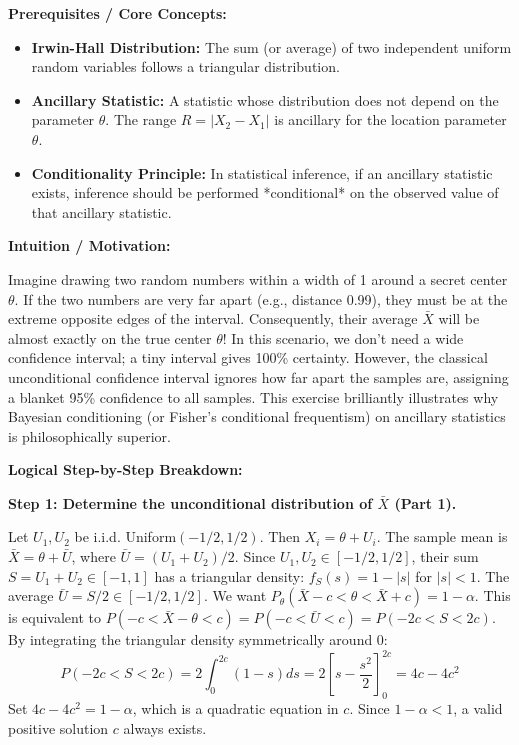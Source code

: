 \begin{solution}
\textbf{Prerequisites / Core Concepts:}
\begin{itemize}
    \item \textbf{Irwin-Hall Distribution:} The sum (or average) of two independent uniform random variables follows a triangular distribution.
    \item \textbf{Ancillary Statistic:} A statistic whose distribution does not depend on the parameter $\theta$. The range $R = |X_2 - X_1|$ is ancillary for the location parameter $\theta$.
    \item \textbf{Conditionality Principle:} In statistical inference, if an ancillary statistic exists, inference should be performed *conditional* on the observed value of that ancillary statistic.
\end{itemize}

\textbf{Intuition / Motivation:}

Imagine drawing two random numbers within a width of 1 around a secret center $\theta$. If the two numbers are very far apart (e.g., distance 0.99), they must be at the extreme opposite edges of the interval. Consequently, their average $\bar{X}$ will be almost exactly on the true center $\theta$! In this scenario, we don't need a wide confidence interval; a tiny interval gives 100\% certainty. However, the classical unconditional confidence interval ignores how far apart the samples are, assigning a blanket 95\% confidence to all samples. This exercise brilliantly illustrates why Bayesian conditioning (or Fisher's conditional frequentism) on ancillary statistics is philosophically superior.

\textbf{Logical Step-by-Step Breakdown:}

\textbf{Step 1: Determine the unconditional distribution of $\bar{X}$ (Part 1).}

Let $U_1, U_2$ be i.i.d. Uniform$(-1/2, 1/2)$. Then $X_i = \theta + U_i$.
The sample mean is $\bar{X} = \theta + \bar{U}$, where $\bar{U} = (U_1+U_2)/2$.
Since $U_1, U_2 \in [-1/2, 1/2]$, their sum $S = U_1+U_2 \in [-1, 1]$ has a triangular density: $f_S(s) = 1 - |s|$ for $|s| < 1$.
The average $\bar{U} = S/2 \in [-1/2, 1/2]$.
We want $P_\theta(\bar{X} - c < \theta < \bar{X} + c) = 1 - \alpha$.
This is equivalent to $P(-c < \bar{X} - \theta < c) = P(-c < \bar{U} < c) = P(-2c < S < 2c)$.
By integrating the triangular density symmetrically around 0:
\[ P(-2c < S < 2c) = 2 \int_0^{2c} (1-s) ds = 2 \left[ s - \frac{s^2}{2} \right]_0^{2c} = 4c - 4c^2 \]
Set $4c - 4c^2 = 1-\alpha$, which is a quadratic equation in $c$. Since $1-\alpha < 1$, a valid positive solution $c$ always exists.


\end{solution}
